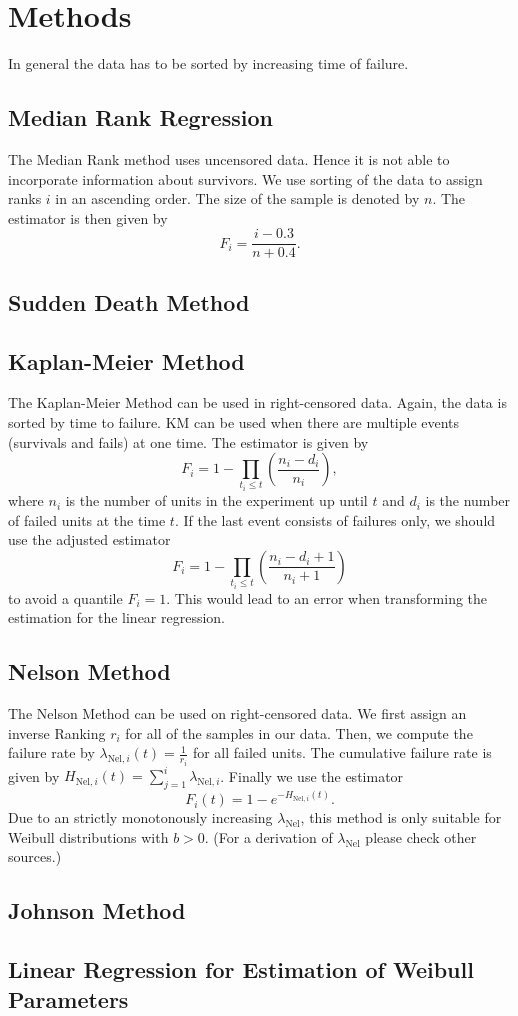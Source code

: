 \section{Methods}
In general the data has to be sorted by increasing time of failure.

\subsection{Median Rank Regression}
The Median Rank method uses uncensored data. Hence it is not able to incorporate information about survivors. 
We use sorting of the data to assign ranks $i$ in an ascending order. The size of the sample is denoted by $n$. The estimator is then given by
$$ F_i = \frac{i - 0.3}{n + 0.4}.$$

\subsection{Sudden Death Method}

\subsection{Kaplan-Meier Method}
The Kaplan-Meier Method can be used in right-censored data. Again, the data is sorted by time to failure. KM can be used when there are multiple events (survivals and fails) at one time.
The estimator is given by
$$ F_i = 1 - \prod_{t_i \leq t} \left( \frac{n_i - d_i}{n_i} \right), $$
where $n_i$ is the number of units in the experiment up until $t$ and $d_i$ is the number of failed units at the time $t$.
If the last event consists of failures only, we should use the adjusted estimator
$$ F_i = 1 - \prod_{t_i \leq t} \left( \frac{n_i - d_i + 1}{n_i + 1} \right) $$
to avoid a quantile $F_i = 1$. This would lead to an error when transforming the estimation for the linear regression.

\subsection{Nelson Method}
The Nelson Method can be used on right-censored data. We first assign an inverse Ranking $r_i$ for all of the samples in our data. Then, we compute the failure rate by $\lambda_{\text{Nel}, i}(t) = \frac{1}{r_i}$ for all failed units. The cumulative failure rate is given by $H_{\text{Nel}, i}(t) = \sum_{j=1}^{i} \lambda_{\text{Nel}, i}$. Finally we use the estimator
$$ F_i(t) = 1 - e^{-H_{\text{Nel}, i}(t)}. $$
Due to an strictly monotonously increasing $\lambda_{\text{Nel}}$, this method is only suitable for Weibull distributions with $b>0$. (For a derivation of $\lambda_{\text{Nel}}$ please check other sources.)

\subsection{Johnson Method}

\subsection{Linear Regression for Estimation of Weibull Parameters}